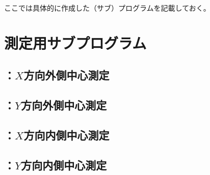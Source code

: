 
ここでは具体的に作成した（サブ）プログラムを記載しておく。



\section{測定用サブプログラム}


\subsection{\MXOThickness：$X$方向外側中心測定}



\clearpage
\subsection{\MYOThickness：$Y$方向外側中心測定}



\clearpage
\subsection{\MXIWidth：$X$方向内側中心測定}



\clearpage
\subsection{\MYIWidth：$Y$方向内側中心測定}



